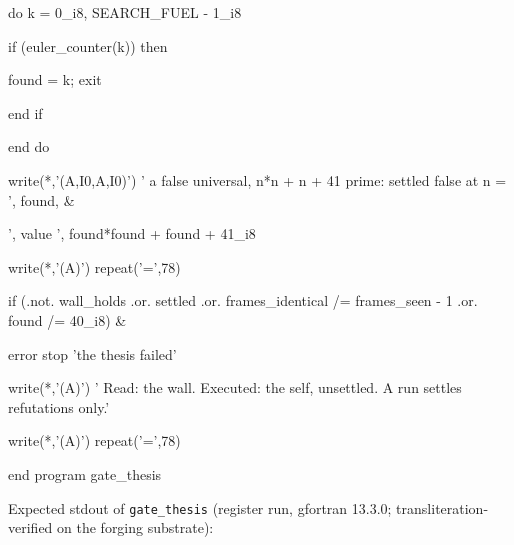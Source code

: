\documentclass[10pt,twocolumn]{article}
\newenvironment{Shaded}{}{}
\newcommand{\BuiltInTok}[1]{#1}
\newcommand{\CommentTok}[1]{#1}
\newcommand{\DecValTok}[1]{#1}
\newcommand{\FunctionTok}[1]{#1}
\newcommand{\KeywordTok}[1]{#1}
\newcommand{\NormalTok}[1]{#1}
\newcommand{\OperatorTok}[1]{#1}
\newcommand{\StringTok}[1]{#1}
\providecommand{\BuiltInTok}[1]{#1}
\providecommand{\CommentTok}[1]{#1}
\providecommand{\DecValTok}[1]{#1}
\providecommand{\FunctionTok}[1]{#1}
\providecommand{\KeywordTok}[1]{#1}
\providecommand{\NormalTok}[1]{#1}
\providecommand{\OperatorTok}[1]{#1}
\providecommand{\StringTok}[1]{#1}
\providecommand{\textquotesingle}{'}
\providecommand{\BuiltInTok}[1]{#1}
\providecommand{\CommentTok}[1]{#1}
\providecommand{\DecValTok}[1]{#1}
\providecommand{\FunctionTok}[1]{#1}
\providecommand{\KeywordTok}[1]{#1}
\providecommand{\NormalTok}[1]{#1}
\providecommand{\OperatorTok}[1]{#1}
\providecommand{\StringTok}[1]{#1}
\begin{document}
\begin{strip}
\begin{Shaded}
\begin{Highlighting}[]
  \KeywordTok{do}\NormalTok{ k }\KeywordTok{=} \DecValTok{0\_i8}\NormalTok{, SEARCH\_FUEL }\KeywordTok{{-}} \DecValTok{1\_i8}

\BuiltInTok{     i}\NormalTok{f (euler\_counter(k)) }\KeywordTok{then}

\NormalTok{        found }\KeywordTok{=}\NormalTok{ k;  }\KeywordTok{exit}

\BuiltInTok{     e}\NormalTok{nd }\KeywordTok{if}

  \KeywordTok{end do}

  \FunctionTok{write(*}\NormalTok{,}\StringTok{\textquotesingle{}(A,I0,A,I0)\textquotesingle{}}\FunctionTok{)} \StringTok{\textquotesingle{}     a false universal, n*n + n + 41 prime: settled false at n = \textquotesingle{}}\NormalTok{, found, }\KeywordTok{\&}

       \StringTok{\textquotesingle{}, value \textquotesingle{}}\NormalTok{, found}\KeywordTok{*}\NormalTok{found }\KeywordTok{+}\NormalTok{ found }\KeywordTok{+} \DecValTok{41\_i8}

  \FunctionTok{write(*}\NormalTok{,}\StringTok{\textquotesingle{}(A)\textquotesingle{}}\FunctionTok{)} \FunctionTok{repeat}\NormalTok{(}\StringTok{\textquotesingle{}=\textquotesingle{}}\NormalTok{,}\DecValTok{78}\NormalTok{)}

  \KeywordTok{if}\NormalTok{ (}\OperatorTok{.not.}\NormalTok{ wall\_holds }\OperatorTok{.or.}\NormalTok{ settled }\OperatorTok{.or.}\NormalTok{ frames\_identical }\OperatorTok{/=}\NormalTok{ frames\_seen}\CommentTok{ {-} 1 .or. found /= 40\_i8) \&}

\NormalTok{       error }\KeywordTok{stop} \StringTok{\textquotesingle{}the thesis failed\textquotesingle{}}

  \FunctionTok{write(*}\NormalTok{,}\StringTok{\textquotesingle{}(A)\textquotesingle{}}\FunctionTok{)} \StringTok{\textquotesingle{} Read: the wall. Executed: the self, unsettled. A run settles refutations only.\textquotesingle{}}

  \FunctionTok{write(*}\NormalTok{,}\StringTok{\textquotesingle{}(A)\textquotesingle{}}\FunctionTok{)} \FunctionTok{repeat}\NormalTok{(}\StringTok{\textquotesingle{}=\textquotesingle{}}\NormalTok{,}\DecValTok{78}\NormalTok{)}

\KeywordTok{end program}\NormalTok{ gate\_thesis}
\end{Highlighting}
\end{Shaded}
\end{strip}

Expected stdout of \texttt{gate\_thesis} (register run, gfortran 13.3.0;
transliteration-verified on the forging substrate):
\end{document}
